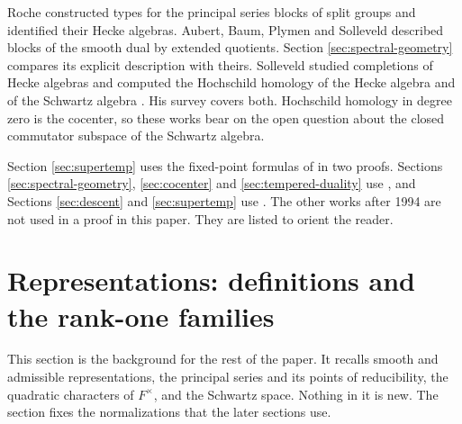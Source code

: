 \documentclass[12pt,letterpaper]{amsart}
\numberwithin{equation}{section}
\theoremstyle{definition}
\theoremstyle{remark}
\begin{document}
Roche \cite{Ro98} constructed types for the principal series blocks of split groups and identified their Hecke algebras. Aubert, Baum, Plymen and Solleveld \cite{ABPS14,ABPS17,ABPS19} described blocks of the smooth dual by extended quotients. Section \ref{sec:spectral-geometry} compares its explicit description with theirs. Solleveld studied completions of Hecke algebras \cite{So19} and computed the Hochschild homology of the Hecke algebra and of the Schwartz algebra \cite{So24}. His survey \cite{So25} covers both. Hochschild homology in degree zero is the cocenter, so these works bear on the open question about the closed commutator subspace of the Schwartz algebra.

Section \ref{sec:supertemp} uses the fixed-point formulas of \cite{SS97,Ko04} in two proofs. Sections \ref{sec:spectral-geometry}, \ref{sec:cocenter} and \ref{sec:tempered-duality} use \cite{Ar94}, and Sections \ref{sec:descent} and \ref{sec:supertemp} use \cite{HC99}. The other works after 1994 are not used in a proof in this paper. They are listed to orient the reader.

\section{Representations: definitions and the rank-one families}\label{sec:rep}
This section is the background for the rest of the paper. It recalls smooth and admissible representations, the principal series and its points of reducibility, the quadratic characters of $F^\times$, and the Schwartz space. Nothing in it is new. The section fixes the normalizations that the later sections use.
\end{document}
